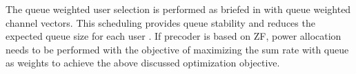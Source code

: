 The queue weighted user selection is performed as briefed in \cite{sus2006zfbf,sun2009eigenmode} with queue weighted channel vectors. This scheduling provides queue stability and reduces the expected queue size for each user \cite{neely2012stability}. If precoder is based on ZF, power allocation needs to be performed with the objective of maximizing the sum rate with queue as weights to achieve the above discussed optimization objective.


